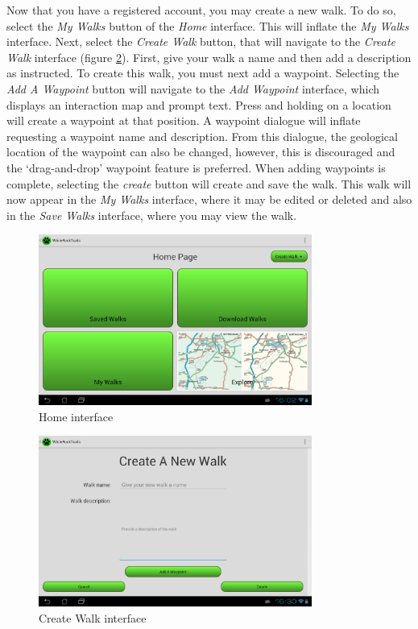 \documentclass[11pt,a4paper]{report}
\begin{document}
Now that you have a registered account, you may create a new walk. To do so, select the \emph{My Walks} button of the \emph{Home} interface. This will inflate the \emph{My Walks} interface. Next, select the \emph{Create Walk} button, that will navigate to the \emph{Create Walk} interface (figure \ref{fig:create_walkUM}). First, give your walk a name and then add a description as instructed. To create this walk, you must next add a waypoint. Selecting the \emph{Add A Waypoint} button will navigate to the \emph{Add Waypoint} interface, which displays an interaction map and prompt text. Press and holding on a location will create a waypoint at that position. A waypoint dialogue will inflate requesting a waypoint name and description. From this dialogue, the geological location of the waypoint can also be changed, however, this is discouraged and the `drag-and-drop' waypoint feature is preferred. When adding waypoints is complete, selecting the \emph{create} button will create and save the walk. This walk will now appear in the \emph{My Walks} interface, where it may be edited or deleted and also in the \emph{Save Walks} interface, where you may view the walk.

\begin{figure}[H]
    \centering
    \includegraphics[width=0.8\textwidth]{chris/home}
    \caption{Home interface}
    \label{fig:homeUM}
\end{figure}

\begin{figure}[H]
    \centering
    \includegraphics[width=0.8\textwidth]{chris/create_walk}
    \caption{Create Walk interface}
    \label{fig:create_walkUM}
\end{figure}
\end{document}
